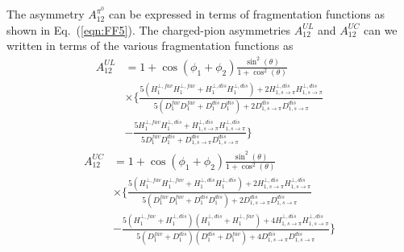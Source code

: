 The asymmetry $A_{12}^{\pi^0}$ can be expressed in terms of fragmentation functions as shown in Eq.~(\ref{eqn:FF5}). %
The charged-pion asymmetries $A^{UL}_{12}$ and $A^{UC}_{12}$ can we written in terms of the various fragmentation functions as
%
\begin{equation}
\begin{aligned}
A^{UL}_{12}&=1+\cos(\phi_1+\phi_2)\frac{\sin^2(\theta)}{1+\cos^2(\theta)}\\
&\times\bigg\{\frac{5(H^{\bot,fav}_1H^{\bot,fav}_1+H^{\bot,dis}_1H^{\bot,dis}_1)+2H^{\bot,dis}_{1,s\rightarrow\pi}H^{\bot,dis}_{1,s\rightarrow\pi}}{5(D^{fav}_1D^{fav}_1+D^{dis}_1 D^{dis}_1)+2D^{dis}_{1,s\rightarrow\pi}D^{dis}_{1,s\rightarrow\pi}}\\
&-\frac{5H^{\bot,fav}_1 H^{\bot,dis}_1+H^{\bot,dis}_{1,s\rightarrow\pi}H^{\bot,dis}_{1,s\rightarrow\pi}}{5D^{fav}_1D^{dis}_1 +D^{dis}_{1,s\rightarrow\pi}D^{dis}_{1,s\rightarrow\pi}} \bigg\} 
\end{aligned}
\label{eqn:allratiosexpress2}
\end{equation}
\begin{equation}
\begin{aligned}
A^{UC}_{12}&=1+\cos(\phi_1+\phi_2)\frac{\sin^2(\theta)}{1+\cos^2(\theta)}\\
&\times\bigg\{\frac{5(H^{\bot,fav}_1H^{\bot,fav}_1+H^{\bot,dis}_1H^{\bot,dis}_1)+2H^{\bot,dis}_{1,s\rightarrow\pi}H^{\bot,dis}_{1,s\rightarrow\pi}}{5(D^{fav}_1D^{fav}_1+D^{dis}_1D^{dis}_1)+2D^{dis}_{1,s\rightarrow\pi}D^{dis}_{1,s\rightarrow\pi}}\\
&-\frac{5(H^{\bot,fav}_1+H^{\bot,dis}_1)(H^{\bot,dis}_1+H^{\bot,fav}_1)+4H^{\bot,dis}_{1,s\rightarrow\pi}H^{\bot,dis}_{1,s\rightarrow\pi}}{5(D^{fav}_1+D^{dis}_1)(D^{dis}_1+D^{fav}_1)+4D^{dis}_{1,s\rightarrow\pi}D^{dis}_{1,s\rightarrow\pi}} \bigg\}
\end{aligned}
\label{eqn:allratiosexpress3}
\end{equation}

